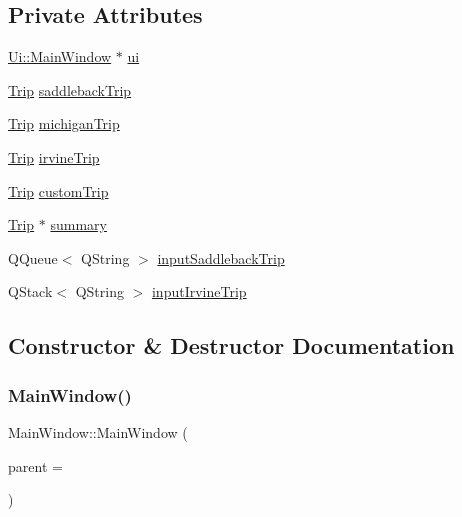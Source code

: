 \subsection*{Private Attributes}
\begin{DoxyCompactItemize}
\item 
\hyperlink{class_ui_1_1_main_window}{Ui\+::\+Main\+Window} $\ast$ \hyperlink{class_main_window_a35466a70ed47252a0191168126a352a5}{ui}
\item 
\hyperlink{class_trip}{Trip} \hyperlink{class_main_window_a7a04807a1af0d121867388cd082e717a}{saddleback\+Trip}
\item 
\hyperlink{class_trip}{Trip} \hyperlink{class_main_window_a40ed826d8dce2da6c9191c958065efd5}{michigan\+Trip}
\item 
\hyperlink{class_trip}{Trip} \hyperlink{class_main_window_ae9cbfed365ac7d27e8b37ae8c9dbbdca}{irvine\+Trip}
\item 
\hyperlink{class_trip}{Trip} \hyperlink{class_main_window_a97fd2146e974d2e019e2162411f4152c}{custom\+Trip}
\item 
\hyperlink{class_trip}{Trip} $\ast$ \hyperlink{class_main_window_a87098a9b9a64b9ebc66c852e4d24e692}{summary}
\item 
Q\+Queue$<$ Q\+String $>$ \hyperlink{class_main_window_aa2ac482c15e7cbdd9a764ddc6832bfb6}{input\+Saddleback\+Trip}
\item 
Q\+Stack$<$ Q\+String $>$ \hyperlink{class_main_window_a87c4d72addfb24d4dea610f15dee0425}{input\+Irvine\+Trip}
\end{DoxyCompactItemize}


\subsection{Constructor \& Destructor Documentation}
\mbox{\label{class_main_window_a8b244be8b7b7db1b08de2a2acb9409db}} 
\subsubsection{\texorpdfstring{Main\+Window()}{MainWindow()}}
{\footnotesize\ttfamily Main\+Window\+::\+Main\+Window (\begin{DoxyParamCaption}\item[{Q\+Widget $\ast$}]{parent = {} }\end{DoxyParamCaption})\hspace{0.3cm}{\ttfamily [explicit]}}

